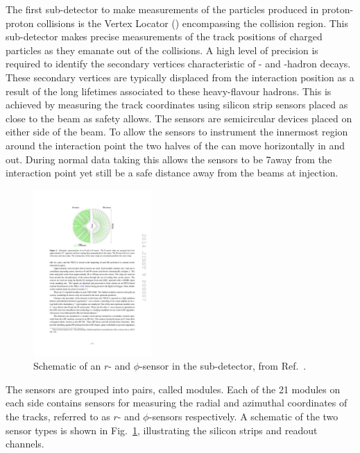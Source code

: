 The first sub-detector to make measurements of the particles produced in proton-proton collisions is the Vertex Locator (\velo) encompassing the collision region. This sub-detector makes precise measurements of the track positions of charged particles as they emanate out of the collisions. A high level of precision is required to identify the secondary vertices characteristic of \bquark- and \cquark-hadron decays. These secondary vertices are typically displaced from the interaction position as a result of the long lifetimes associated to these heavy-flavour hadrons. This is achieved by measuring the track coordinates using silicon strip sensors placed as close to the \lhc beam as safety allows. The \velo sensors are semicircular devices placed on either side of the beam. To allow the sensors to instrument the innermost region around the interaction point the two halves of the \velo can move horizontally in and out. During normal data taking this allows the sensors to be 7\mm away from the interaction point yet still be a safe distance away from the beams at injection. 

\begin{figure}[!h]
    \centering   
    \includegraphics[width=0.4\textwidth]{figs/Detector/velo_r_phi_sensor.pdf}
    \caption{Schematic of an $r$- and $\phi$-sensor in the \velo sub-detector, from Ref.~\cite{LHCb-DP-2014-001}.}
    \label{fig:Dec_r_phi_sensor}   
\end{figure}

The sensors are grouped into pairs, called modules. Each of the 21 modules on each side contains sensors for measuring the radial and azimuthal coordinates of the tracks, referred to as $r$- and $\phi$-sensors respectively. A schematic of the two sensor types is shown in Fig.~\ref{fig:Dec_r_phi_sensor}, illustrating the silicon strips and readout channels. 


